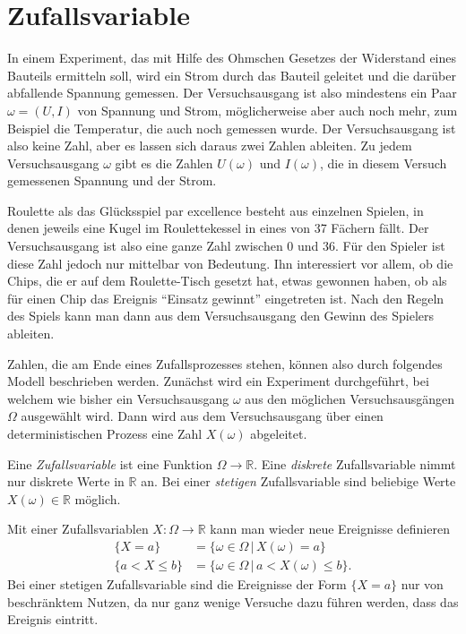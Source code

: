 \section{Zufallsvariable}
In einem Experiment, das mit Hilfe des Ohmschen Gesetzes der Widerstand eines
Bauteils ermitteln soll, wird ein Strom durch das Bauteil geleitet und die
darüber abfallende Spannung gemessen.
Der Versuchsausgang ist also mindestens ein Paar $\omega=(U,I)$ von Spannung und
Strom, möglicherweise aber auch noch mehr, zum Beispiel die Temperatur, die
auch noch gemessen wurde.
Der Versuchsausgang ist also keine Zahl, aber es lassen sich daraus zwei
Zahlen ableiten.
Zu jedem Versuchsausgang $\omega$ gibt es die Zahlen $U(\omega)$
und $I(\omega)$, die in diesem Versuch gemessenen Spannung und der Strom.

Roulette als das Glücksspiel par excellence besteht aus einzelnen
Spielen, in denen jeweils eine Kugel im Roulettekessel in eines von
37 Fächern fällt.
Der Versuchsausgang ist also eine ganze Zahl zwischen $0$ und $36$.
Für den Spieler ist diese Zahl jedoch nur mittelbar von Bedeutung.
Ihn interessiert vor allem, ob die Chips, die er auf dem Roulette-Tisch
gesetzt hat, etwas gewonnen haben, ob als für einen Chip das Ereignis
``Einsatz gewinnt'' eingetreten ist.
Nach den Regeln des Spiels kann man dann aus dem Versuchsausgang den
Gewinn des Spielers ableiten.

Zahlen, die am Ende eines Zufallsprozesses stehen, können also durch
folgendes Modell beschrieben werden.
Zunächst wird ein Experiment durchgeführt, bei welchem wie bisher
ein Versuchsausgang $\omega$ aus den möglichen Versuchsausgängen $\Omega$
ausgewählt wird.
Dann wird aus dem Versuchsausgang über einen deterministischen Prozess
eine Zahl $X(\omega)$ abgeleitet.

\begin{definition}
Eine {\em Zufallsvariable} ist eine Funktion $\Omega\to\mathbb R$.
Eine {\em diskrete} Zufallsvariable nimmt nur diskrete Werte in $\mathbb R$ an.
Bei einer {\em stetigen} Zufallsvariable sind beliebige Werte $X(\omega)\in\mathbb R$
möglich.
\end{definition}

Mit einer Zufallsvariablen $X\colon\Omega\to\mathbb R$ kann man wieder
neue Ereignisse definieren
\begin{align*}
\{X=a\}&=\{\omega\in\Omega\,|\,X(\omega)=a\}
\\
\{a<X\le b\}
&=
\{\omega\in\Omega\,|\, a<X(\omega)\le b\}.
\end{align*}
Bei einer stetigen Zufallsvariable sind die Ereignisse der Form
$\{X=a\}$ nur von beschränktem Nutzen, da nur ganz wenige Versuche
dazu führen werden, dass das Ereignis eintritt.


